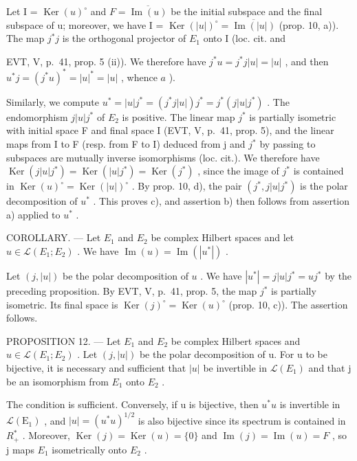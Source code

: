 Let I = \(\operatorname{Ker}(u)^{\circ}\) and \(F = \overline{\operatorname{Im}(u)}\) be the initial subspace and the final subspace of u; moreover, we have I = \(\operatorname{Ker}(|u|)^{\circ} = \overline{\operatorname{Im}(|u|)}\) (prop. 10, a)). The map \(j^{*}j\) is the orthogonal projector of \(E_{1}\) onto I (loc. cit. and

EVT, V, p.~41, prop. 5 (ii)). We therefore have \(j^{*}u = j^{*}j|u| = |u|\) , and then \(u^{*}j = (j^{*}u)^{*} = |u|^{*} = |u|\) , whence \(a\) ).

Similarly, we compute \(u^{*} = |u|j^{*} = (j^{*}j|u|)j^{*} = j^{*}(j|u|j^{*})\) . The endomorphism \(j|u|j^{*}\) of \(E_{2}\) is positive. The linear map \(j^{*}\) is partially isometric with initial space F and final space I (EVT, V, p.~41, prop. 5), and the linear maps from I to F (resp. from F to I) deduced from j and \(j^{*}\) by passing to subspaces are mutually inverse isomorphisms (loc. cit.). We therefore have \(\operatorname{Ker}(j|u|j^{*}) = \operatorname{Ker}(|u|j^{*}) = \operatorname{Ker}(j^{*})\) , since the image of \(j^{*}\) is contained in \(\operatorname{Ker}(u)^{\circ} = \operatorname{Ker}(|u|)^{\circ}\) . By prop. 10, d), the pair \((j^{*}, j|u|j^{*})\) is the polar decomposition of \(u^{*}\) . This proves c), and assertion b) then follows from assertion a) applied to \(u^{*}\) .

COROLLARY. --- Let \(E_{1}\) and \(E_{2}\) be complex Hilbert spaces and let \(u \in \mathcal{L}(E_{1}; E_{2})\) . We have \(\operatorname{Im}(u) = \operatorname{Im}(|u^{*}|)\) .

Let \((j, |u|)\) be the polar decomposition of \(u\) . We have \(|u^{*}| = j|u|j^{*} = uj^{*}\) by the preceding proposition. By EVT, V, p.~41, prop. 5, the map \(j^{*}\) is partially isometric. Its final space is \(\operatorname{Ker}(j)^{\circ} = \operatorname{Ker}(u)^{\circ}\) (prop. 10, c)). The assertion follows.

PROPOSITION 12. — Let \(E_{1}\) and \(E_{2}\) be complex Hilbert spaces and \(u \in \mathcal{L}(E_{1}; E_{2})\) . Let \((j, |u|)\) be the polar decomposition of u. For u to be bijective, it is necessary and sufficient that \(|u|\) be invertible in \(\mathcal{L}(E_{1})\) and that j be an isomorphism from \(E_{1}\) onto \(E_{2}\) .

The condition is sufficient. Conversely, if u is bijective, then \(u^{*}u\) is invertible in \(\mathcal{L}(\mathrm{E}_{1})\) , and \(|u| = (u^{*}u)^{1/2}\) is also bijective since its spectrum is contained in \(R_{+}^{*}\) . Moreover, \(\operatorname{Ker}(j) = \operatorname{Ker}(u) = \{0\}\) and \(\operatorname{Im}(j) = \operatorname{Im}(u) = F\) , so j maps \(E_{1}\) isometrically onto \(E_{2}\) .

